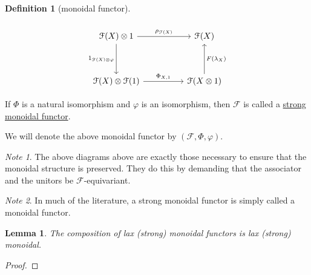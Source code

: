 \documentclass[a4paper]{report}
\newcommand{\defn}[1]{\ul{#1}}
\theoremstyle{definition}
\newtheorem{definition}{Definition}[section]
\theoremstyle{plain}
\newtheorem{lemma}{Lemma}[section]
\theoremstyle{remark}
\newtheorem{note}{Note}[section]
\begin{document}
\begin{definition}[monoidal functor]
\begin{itemize}
\begin{equation*}
      \end{equation*}
      \begin{equation*}
        \begin{tikzcd}[row sep=huge, column sep=huge]
          \mathcal{F}(X) \otimes 1
          \arrow[r, "\rho_{\mathcal{F}(X)}"]
          \arrow[d, swap, "1_{\mathcal{F}(X)\otimes \varphi }"]
          & \mathcal{F}(X)
          \\
          \mathcal{F}(X) \otimes \mathcal{F}(1) 
          \arrow[r, "\Phi_{X, 1}"]
          & \mathcal{F}(X \otimes 1)
          \arrow[u, swap, "F(\lambda_{X})"]
        \end{tikzcd}
      \end{equation*}
  \end{itemize}

  If $\Phi$ is a natural isomorphism and $\varphi$ is an isomorphism, then $\mathcal{F}$ is called a \defn{strong monoidal functor}.

  We will denote the above monoidal functor by $(\mathcal{F}, \Phi, \varphi)$.
\end{definition}

\begin{note}
  The above diagrams above are exactly those necessary to ensure that the monoidal structure is preserved. They do this by demanding that the associator and the unitors be $\mathcal{F}$-equivariant.
\end{note} 

\begin{note}
  In much of the literature, a strong monoidal functor is simply called a monoidal functor.
\end{note}

\begin{lemma}
  The composition of lax (strong) monoidal functors is lax (strong) monoidal.
\end{lemma}
\begin{proof}

\end{proof}
\end{document}
